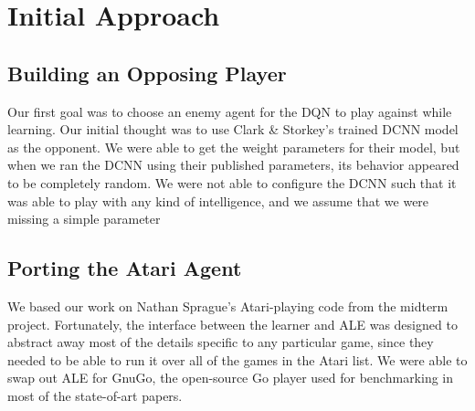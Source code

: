 \section{Initial Approach}

\subsection{Building an Opposing Player}

Our first goal was to choose an enemy agent for the DQN to play against while learning. Our initial thought was to use Clark \& Storkey's trained DCNN model as the opponent. We were able to get the weight parameters for their model, but when we ran the DCNN using their published parameters, its behavior appeared to be completely random. We were not able to configure the DCNN such that it was able to play with any kind of intelligence, and we assume that we were missing a simple parameter 

\subsection{Porting the Atari Agent}

We based our work on Nathan Sprague's Atari-playing code from the midterm project. Fortunately, the interface between the learner and ALE was designed to abstract away most of the details specific to any particular game, since they needed to be able to run it over all of the games in the Atari list. We were able to swap out ALE for GnuGo, the open-source Go player used for benchmarking in most of the state-of-art papers.